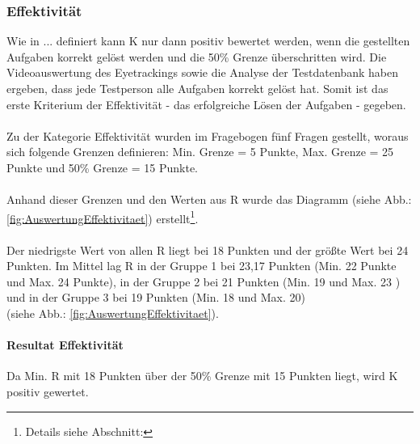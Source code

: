 \documentclass[Bachelorarbeit.tex]{subfiles}
\begin{document}
\subsubsection{Effektivität}
Wie in ... definiert kann K nur dann positiv bewertet werden, wenn die gestellten Aufgaben korrekt gelöst werden und die 50\% Grenze überschritten wird. 
Die Videoauswertung des Eyetrackings sowie die Analyse der Testdatenbank haben ergeben, dass jede Testperson alle Aufgaben korrekt gelöst hat. 
Somit ist das erste Kriterium der Effektivität - das erfolgreiche Lösen der Aufgaben - gegeben.\\
\\
Zu der Kategorie Effektivität wurden im Fragebogen fünf Fragen gestellt, woraus sich folgende Grenzen definieren: Min. Grenze = 5 Punkte, Max. Grenze = 25 Punkte und 50\% Grenze = 15 Punkte.\\
\\
Anhand dieser Grenzen und den Werten aus R wurde das Diagramm  (siehe Abb.: \ref{fig:AuswertungEffektivitaet}) erstellt\footnote{Details siehe Abschnitt: }.\\
\\
Der niedrigste Wert von allen R liegt bei 18 Punkten und der größte Wert bei 24 Punkten.
Im Mittel lag R in der Gruppe 1 bei 23,17 Punkten (Min. 22 Punkte und Max. 24 Punkte), in der Gruppe 2 bei 21 Punkten (Min. 19 und Max. 23 ) und in der Gruppe 3 bei 19 Punkten (Min. 18 und Max. 20)\\
(siehe Abb.: \ref{fig:AuswertungEffektivitaet}).

\paragraph{Resultat Effektivität} Da Min. R mit 18 Punkten über der 50\% Grenze mit 15 Punkten liegt, wird K positiv gewertet.
\end{document}
